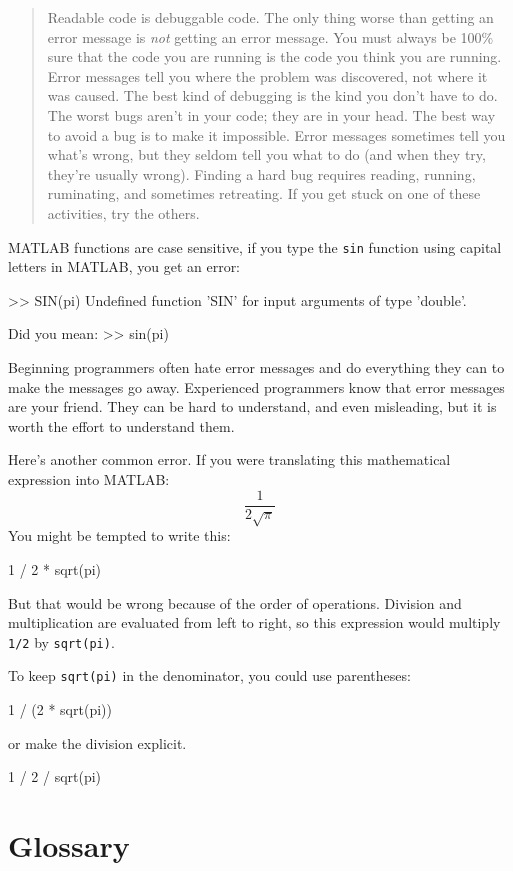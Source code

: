 \documentclass[
]{book}
\numberwithin{Answer}{chapter}
\numberwithin{Exercise}{chapter}
\newcommand{\displaythrm}[1]{%
    \ifthenelse{\equal{#1}{1}}%
        {Readable code is debuggable code.}{%
    \ifthenelse{\equal{#1}{2}}%
        {The only thing worse than getting an error message is {\em
         not} getting an error message.}{%
    \ifthenelse{\equal{#1}{3}}%
        {You must always be 100\% sure that the code you are running
         is the code you think you are running.}{%
    \ifthenelse{\equal{#1}{4}}%
        {Error messages tell you where the problem was discovered,
         not where it was caused.}{%
    \ifthenelse{\equal{#1}{5}}%
        {The best kind of debugging is the kind you don't have to do.}{%
    \ifthenelse{\equal{#1}{6}}%
        {The worst bugs aren't in your code; they are in your head.}{%
    \ifthenelse{\equal{#1}{7}}%
        {The best way to avoid a bug is to make it impossible.}{%
    \ifthenelse{\equal{#1}{8}}%
        {Error messages sometimes tell you what's wrong, but they
         seldom tell you what to do (and when they try, they're usually
         wrong).}{%
    \ifthenelse{\equal{#1}{9}}%
        {Finding a hard bug requires reading, running, ruminating,
         and sometimes retreating.  If you get stuck on one of these
         activities, try the others.}{%
    {}%
}}}}}}}}}}%
\begin{document}
\begin{quote}
\displaythrm{2}
\end{quote}

MATLAB functions are case sensitive, if you type the {\tt sin} function using capital letters in MATLAB, you get an error:

\begin{code}
>> SIN(pi)
Undefined function 'SIN' for input arguments of type 'double'.

Did you mean:
>> sin(pi)
\end{code}

Beginning programmers often hate error messages and do everything they
can to make the messages go away.  Experienced programmers know that error
messages are your friend.  They can be hard to understand, and even
misleading, but it is worth the effort to understand them.

Here's another common error.
If you were translating this mathematical expression into MATLAB:
%
\[ \frac{1}{2 \sqrt \pi} \]
%
You might be tempted to write this:

\begin{code}
1 / 2 * sqrt(pi)
\end{code}

But that would be wrong because of the order of operations.  Division and multiplication are evaluated from left to right, so this expression would multiply {\tt 1/2} by {\tt sqrt(pi)}.

To keep {\tt sqrt(pi)} in the denominator, you could use parentheses:

\begin{code}
1 / (2 * sqrt(pi))
\end{code}

or make the division explicit.

\begin{code}
1 / 2 / sqrt(pi)
\end{code}




\section{Glossary}
\end{document}
